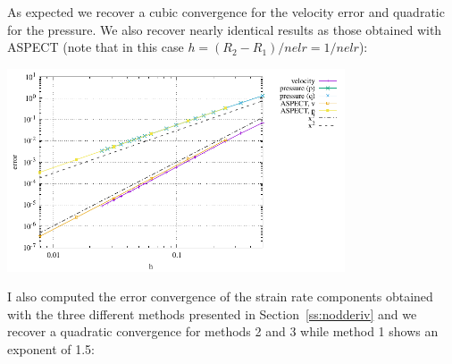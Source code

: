 As expected we recover a cubic convergence for the velocity error and quadratic for the 
pressure. We also recover nearly identical results as those obtained with ASPECT (note that 
in this case $h=(R_2-R_1)/nelr=1/nelr$): 

\begin{center}
\includegraphics[width=10cm]{python_codes/fieldstone_21/results/errors.pdf}
\end{center}

I also computed the error convergence of the strain rate components obtained with 
the three different methods presented in Section~\ref{ss:nodderiv}
and we recover a quadratic convergence for methods 2 and 3 while method 1 
shows an exponent of 1.5:

